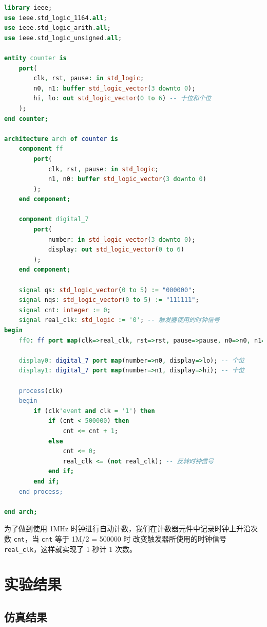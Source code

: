 \documentclass[a4paper]{article}
\begin{document}
\begin{lstlisting}[language=vhdl]
library ieee;
use ieee.std_logic_1164.all;
use ieee.std_logic_arith.all;
use ieee.std_logic_unsigned.all;

entity counter is
    port(
        clk, rst, pause: in std_logic;
        n0, n1: buffer std_logic_vector(3 downto 0);
        hi, lo: out std_logic_vector(0 to 6) -- 十位和个位
    );
end counter;

architecture arch of counter is
    component ff
        port(
            clk, rst, pause: in std_logic;
            n1, n0: buffer std_logic_vector(3 downto 0)
        );
    end component;
    
    component digital_7
        port(
            number: in std_logic_vector(3 downto 0);
            display: out std_logic_vector(0 to 6)
        );
    end component;
    
    signal qs: std_logic_vector(0 to 5) := "000000";
    signal nqs: std_logic_vector(0 to 5) := "111111";
    signal cnt: integer := 0;
    signal real_clk: std_logic := '0'; -- 触发器使用的时钟信号
begin
    ff0: ff port map(clk=>real_clk, rst=>rst, pause=>pause, n0=>n0, n1=>n1);
    
    display0: digital_7 port map(number=>n0, display=>lo); -- 个位
    display1: digital_7 port map(number=>n1, display=>hi); -- 十位
    
    process(clk)
    begin
        if (clk'event and clk = '1') then
            if (cnt < 500000) then
                cnt <= cnt + 1;
            else
                cnt <= 0;
                real_clk <= (not real_clk); -- 反转时钟信号
            end if;
        end if;
    end process;
    
end arch;
\end{lstlisting}

为了做到使用 1MHz 时钟进行自动计数，我们在计数器元件中记录时钟上升沿次数 \texttt{cnt}，当 \texttt{cnt} 等于 1M/2 = 500000 时
改变触发器所使用的时钟信号 \texttt{real\_clk}，这样就实现了 1 秒计 1 次数。


\section{实验结果}

\subsection{仿真结果}
\end{document}
